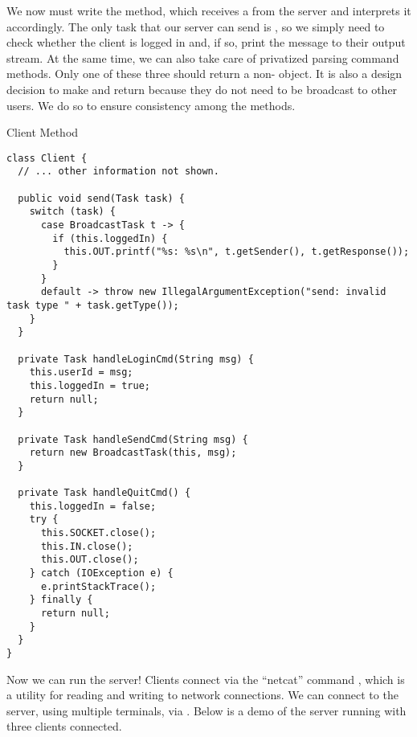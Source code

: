 We now must write the   method, which receives a  from the server and interprets it accordingly. The only task that our server can send is , so we simply need to check whether the client is logged in and, if so, print the message to their output stream. At the same time, we can also take care of privatized parsing command methods. Only one of these three should return a non- object. It is also a design decision to make  and  return  because they do not need to be broadcast to other users. We do so to ensure consistency among the methods.

\begin{cl}{Client  Method}
\begin{lstlisting}[language=MyJava]
class Client {
  // ... other information not shown.

  public void send(Task task) {
    switch (task) {
      case BroadcastTask t -> {
        if (this.loggedIn) { 
          this.OUT.printf("%s: %s\n", t.getSender(), t.getResponse()); 
        }
      }
      default -> throw new IllegalArgumentException("send: invalid task type " + task.getType());
    }
  }

  private Task handleLoginCmd(String msg) {
    this.userId = msg;
    this.loggedIn = true;
    return null;
  }

  private Task handleSendCmd(String msg) {
    return new BroadcastTask(this, msg);
  }

  private Task handleQuitCmd() {
    this.loggedIn = false;
    try {
      this.SOCKET.close();
      this.IN.close();
      this.OUT.close();
    } catch (IOException e) { 
      e.printStackTrace(); 
    } finally {
      return null;
    }
  }
}
\end{lstlisting}
\end{cl}

Now we can run the server! Clients connect via the ``netcat'' command , which is a utility for reading and writing to network connections. We can connect to the server, using multiple terminals, via . Below is a demo of the server running with three clients connected.